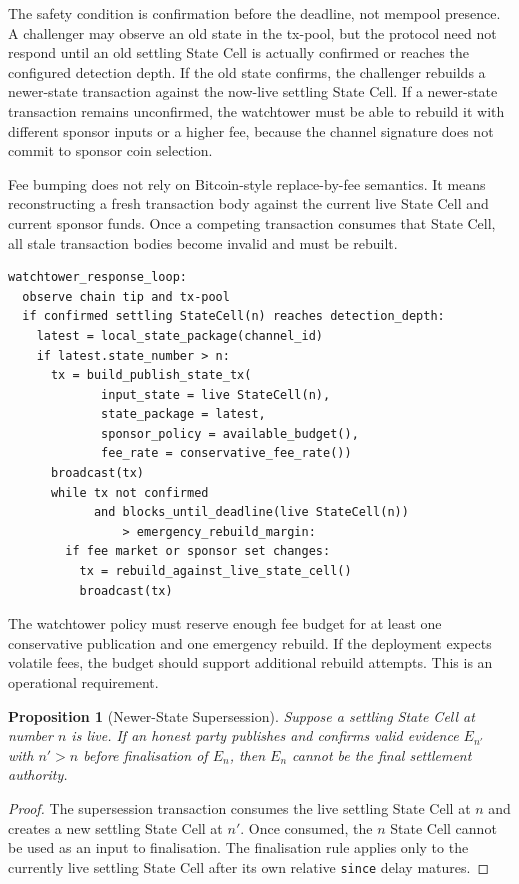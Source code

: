 \documentclass[a4paper,11pt]{article}
\newtheorem{proposition}{Proposition}
\begin{document}
The safety condition is confirmation before the deadline, not mempool presence. A challenger may observe an old state in the tx-pool, but the protocol need not respond until an old settling State Cell is actually confirmed or reaches the configured detection depth. If the old state confirms, the challenger rebuilds a newer-state transaction against the now-live settling State Cell. If a newer-state transaction remains unconfirmed, the watchtower must be able to rebuild it with different sponsor inputs or a higher fee, because the channel signature does not commit to sponsor coin selection.

Fee bumping does not rely on Bitcoin-style replace-by-fee semantics. It means reconstructing a fresh transaction body against the current live State Cell and current sponsor funds. Once a competing transaction consumes that State Cell, all stale transaction bodies become invalid and must be rebuilt.

\begin{lstlisting}
watchtower_response_loop:
  observe chain tip and tx-pool
  if confirmed settling StateCell(n) reaches detection_depth:
    latest = local_state_package(channel_id)
    if latest.state_number > n:
      tx = build_publish_state_tx(
             input_state = live StateCell(n),
             state_package = latest,
             sponsor_policy = available_budget(),
             fee_rate = conservative_fee_rate())
      broadcast(tx)
      while tx not confirmed
            and blocks_until_deadline(live StateCell(n))
                > emergency_rebuild_margin:
        if fee market or sponsor set changes:
          tx = rebuild_against_live_state_cell()
          broadcast(tx)
\end{lstlisting}

The watchtower policy must reserve enough fee budget for at least one conservative publication and one emergency rebuild. If the deployment expects volatile fees, the budget should support additional rebuild attempts. This is an operational requirement.

\begin{proposition}[Newer-State Supersession]
Suppose a settling State Cell at number $n$ is live. If an honest party publishes and confirms valid evidence $E_{n'}$ with $n'>n$ before finalisation of $E_n$, then $E_n$ cannot be the final settlement authority.
\end{proposition}

\begin{proof}
The supersession transaction consumes the live settling State Cell at $n$ and creates a new settling State Cell at $n'$. Once consumed, the $n$ State Cell cannot be used as an input to finalisation. The finalisation rule applies only to the currently live settling State Cell after its own relative \texttt{since} delay matures.
\end{proof}
\end{document}
